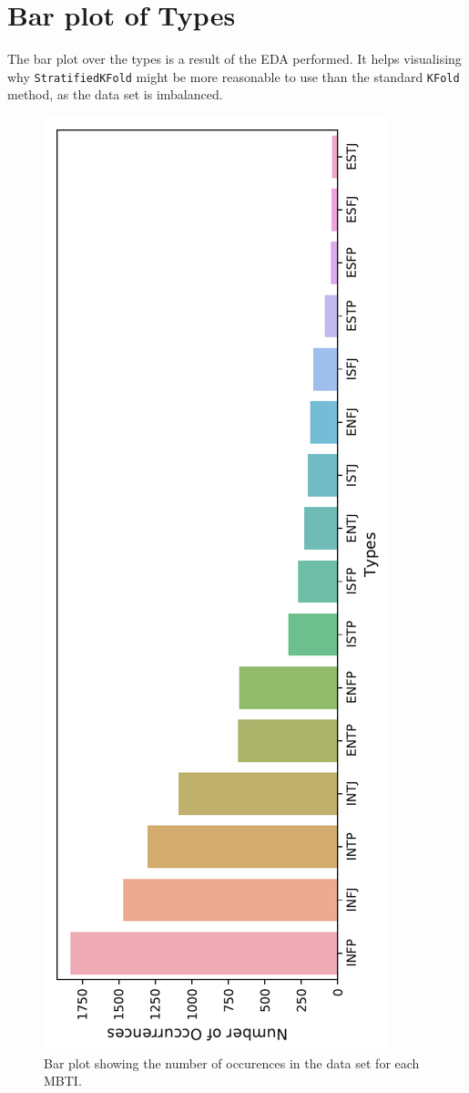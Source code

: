 \section{Bar plot of Types} \label{appendix:types-barplot}
The bar plot over the types is a result of the EDA performed.
It helps visualising why \texttt{StratifiedKFold} might be more reasonable to use than the standard \texttt{KFold} method, as the data set is imbalanced.

\begin{figure}[htp] 
    \centering
    \caption{Bar plot showing the number of occurences in the data set for each MBTI.}
    \label{fig:types-barplot}
    \includegraphics[scale=0.7]{types_barplot.pdf}
\end{figure}